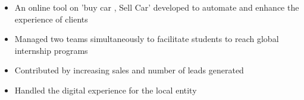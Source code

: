 \documentclass[10pt,a4paper]{altacv}
\begin{document}
\tagline{}

\begin{fullwidth}
\makecvheader
\end{fullwidth}



\begin{itemize}
\item An online tool on 'buy car , Sell Car' developed to automate and enhance the experience of clients
\end{itemize}


\divider

\begin{itemize}
\item Managed two teams simultaneously to facilitate students to reach global internship programs
\item Contributed by increasing sales and number of leads generated
\item Handled the digital experience for the local entity
\end{itemize}
\end{document}
